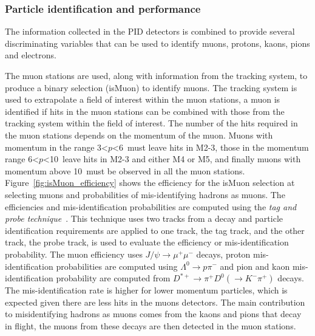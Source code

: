 \subsubsection{Particle identification and performance}
\label{PID_variables}

The information collected in the PID detectors is combined to provide several discriminating variables that can be used to identify muons, protons, kaons, pions and electrons.

The muon stations are used, along with information from the tracking system, to produce a binary selection (isMuon) to identify muons. The tracking system is used to extrapolate a field of interest within the muon stations, a muon is identified if hits in the muon stations can be combined with those from the tracking system within the field of interest. The number of the hits required in the muon stations depends on the momentum of the muon. Muons with momentum in the range 3<$p$<6~\gevc must leave hits in M2-3, those in the momentum range 6<$p$<10~\gevc leave hits in M2-3 and either M4 or M5, and finally muons with momentum above 10~\gevc must be observed in all the muon stations. Figure~\ref{fig:isMuon_efficiency} shows the efficiency for the isMuon selection at selecting muons and probabilities of mis-identifying hadrons as muons. The efficiencies and mis-identification probabilities are computed using the {\it tag and probe technique}~\cite{}. This technique uses two tracks from a decay and particle identification requirements are applied to one track, the tag track, and the other track, the probe track, is used to evaluate the efficiency or mis-identification probability. The muon efficiency uses $J/\psi \to \mu^+ \mu^-$ decays, proton mis-identification probabilities are computed using $\Lambda^0 \to p \pi^-$ and pion and kaon mis-identification probability are computed from $D^{*+} \to \pi^+ D^0 (\to K^- \pi^+)$ decays. The mis-identification rate is higher for lower momentum particles, which is expected given there are less hits in the muons detectors. The main contribution to misidentifying hadrons as muons comes from the kaons and pions that decay in flight, the muons from these decays are then detected in the muon stations.


